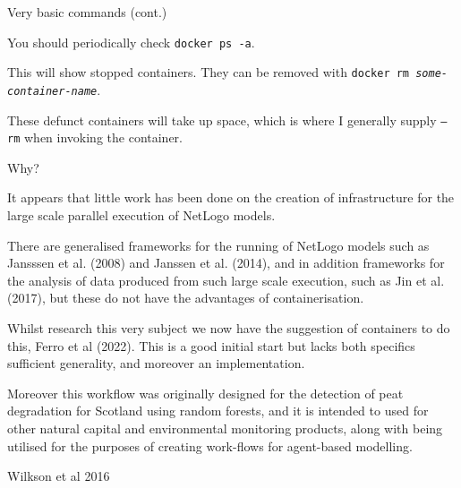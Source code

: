 \documentclass[usenames,dvipsnames,10pt]{beamer}
\begin{document}
\begin{frame}{Very basic commands (cont.)}

    \vfill
    You should periodically check {\color{blue}\texttt{docker ps -a}}.

    \vfill
    This will show stopped containers. They can be removed with
    {\color{blue}\texttt{docker rm \textit{some-container-name}}}.

    \vfill
    These defunct containers will take up space, which is where I generally
    supply {\color{blue}\texttt{--rm}} when invoking the container.

\end{frame}

\begin{frame}{Why?}

    \small
    \vfill
    It appears that little work has been done on the creation of infrastructure for the  large scale parallel execution of NetLogo models.

    \vfill
    There are generalised frameworks for the running of NetLogo models such as Jansssen et al. (2008) and Janssen et al. (2014), and in addition frameworks for the analysis of data produced  from such large scale execution, such as Jin et al. (2017), but these do not have the advantages of containerisation.

    \vfill
    Whilst research this very subject we now have the suggestion of containers to do this, Ferro et al (2022). This is a good initial start but lacks both specifics sufficient generality, and moreover an implementation.

    \vfill
    Moreover this workflow was originally designed for the detection of peat
    degradation for Scotland using random forests, and it is  intended to
    used for other natural capital and environmental monitoring products,
    along with being utilised for the purposes of creating work-flows for
    agent-based modelling.
    \begin{flushright}
        Wilkson et al 2016
    \end{flushright}
    \vfill
\end{frame}
\end{document}
